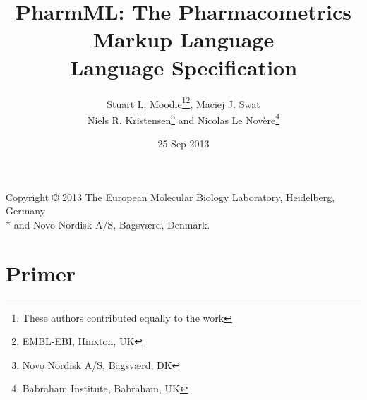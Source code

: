 \documentclass[12pt,oneside, onecolumn,a4paper]{pharmmlspec}
\title{PharmML: The Pharmacometrics Markup Language\\
\vspace{1cm}
\Large%
Language Specification}
\author{Stuart L. Moodie\thanks{These authors contributed equally to the
  work}\thanks{EMBL-EBI, Hinxton, UK}, Maciej J. Swat\thanksmark{1}\thanksmark{2}\\
Niels R. Kristensen\thanks{Novo Nordisk A/S, Bagsv\ae rd, DK}
and Nicolas Le Nov\`{e}re\thanksmark{2}\thanks{Babraham Institute,
  Babraham, UK}}
\date{25 Sep 2013}
\begin{document}
\frontmatter


\begin{titlingpage}
\usethanksrule
 \maketitle
\end{titlingpage}


\cleardoublepage

   \begin{minipage}{16cm}%
Copyright \copyright\xspace 2013 The European Molecular Biology
Laboratory, Heidelberg, Germany\\* and Novo Nordisk A/S, Bagsv\ae rd, Denmark.
\end{minipage}




\clearpage

\tableofcontents



\mainmatter
\renewcommand{\thefootnote}{\arabic{footnote}}

\modulolinenumbers[5]
\linenumbers

\part{\pharmml Primer}
\label{part:primer}




\end{document}
